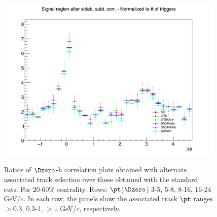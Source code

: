\begin{figure}
{\includegraphics[width=0.31\linewidth]{figuresVsCent/Dzero/SystTrackEff/20_60/AzimCorrDistr_Dzero_Canvas_PtIntBins12to12_PoolInt_thr1to99_Superimp.png}} \\
 \caption{Ratios of $\Dzero$-h correlation plots obtained with alternate associated track selection over those obtained with the standard cuts. For 20-60\% centrality. Rows: $\pt$($\Dzero$) 3-5, 5-8, 8-16, 16-24 GeV/$c$. In each row, the panels show the associated track
$\pt$ ranges $> 0.3$, 0.3-1, $> 1$ GeV/$c$, respectively.}
\label{fig:SysTrEff2060}
\end{figure}

